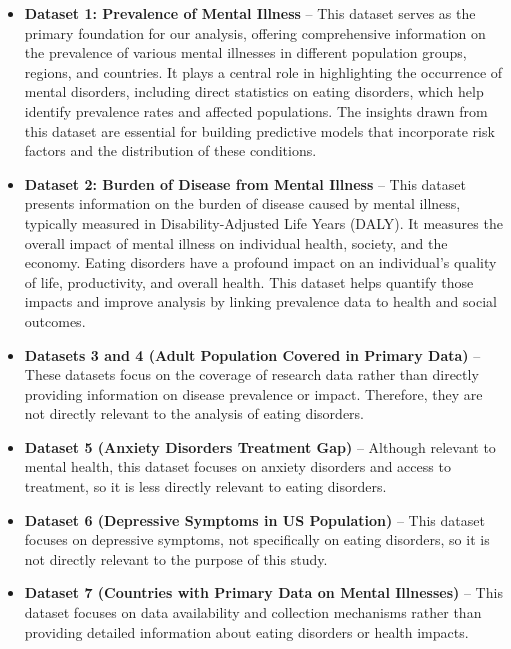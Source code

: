 \begin{itemize}
   \item \textbf{Dataset 1: Prevalence of Mental Illness} – This dataset serves as the primary foundation for our analysis, offering comprehensive information on the prevalence of various mental illnesses in different population groups, regions, and countries. It plays a central role in highlighting the occurrence of mental disorders, including direct statistics on eating disorders, which help identify prevalence rates and affected populations. The insights drawn from this dataset are essential for building predictive models that incorporate risk factors and the distribution of these conditions.
   
   \item \textbf{Dataset 2: Burden of Disease from Mental Illness} – This dataset presents information on the burden of disease caused by mental illness, typically measured in Disability-Adjusted Life Years (DALY). It measures the overall impact of mental illness on individual health, society, and the economy. Eating disorders have a profound impact on an individual's quality of life, productivity, and overall health. This dataset helps quantify those impacts and improve analysis by linking prevalence data to health and social outcomes.

   \item \textbf{Datasets 3 and 4 (Adult Population Covered in Primary Data)} – These datasets focus on the coverage of research data rather than directly providing information on disease prevalence or impact. Therefore, they are not directly relevant to the analysis of eating disorders.

   \item \textbf{Dataset 5 (Anxiety Disorders Treatment Gap)} – Although relevant to mental health, this dataset focuses on anxiety disorders and access to treatment, so it is less directly relevant to eating disorders.

   \item \textbf{Dataset 6 (Depressive Symptoms in US Population)} – This dataset focuses on depressive symptoms, not specifically on eating disorders, so it is not directly relevant to the purpose of this study.

   \item \textbf{Dataset 7 (Countries with Primary Data on Mental Illnesses)} – This dataset focuses on data availability and collection mechanisms rather than providing detailed information about eating disorders or health impacts.


\end{itemize}
